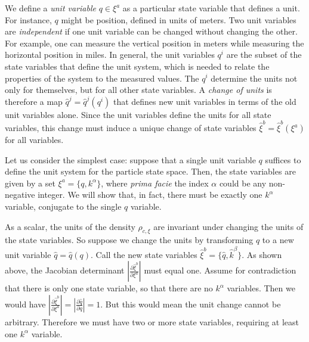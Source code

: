 \documentclass[12pt, english, twoside]{article} %
\begin{document}
We define a \textit{unit variable} $q \in \xi^a$ as a particular state variable that defines a unit. For instance, $q$ might be position, defined in units of meters. Two unit variables are \textit{independent} if one unit variable can be changed without changing the other. For example, one can measure the vertical position in meters while measuring the horizontal position in miles.  In general, the unit variables $q^i$ are the subset of the state variables that define the unit system, which is needed to relate the properties of the system to the measured values. The $q^i$ determine the units not only for themselves, but for all other state variables. A \textit{change of units} is therefore a map $\hat{q}^j = \hat{q}^j(q^i)$ that defines new unit variables in terms of the old unit variables alone. Since the unit variables define the units for all state variables, this change must induce a unique change of state variables $\hat{\xi}^b = \hat{\xi}^b(\xi^a)$ for all variables.

Let us consider the simplest case: suppose that a single unit variable $q $ suffices to define the unit system for the particle state space. Then, the state variables are given by a set $\xi^a = \{ q, k^\alpha \}$, where \textit{prima facie} the index $\alpha$ could be any non-negative integer. We will show that, in fact, there must be exactly one $k^\alpha$ variable, conjugate to the single $q$ variable. 

As a scalar, the units of the density $\rho_{c, \xi}$ are invariant under changing the units of the state variables. So suppose we change the units by transforming $q$ to a new unit variable $\hat{q}=\hat{q}(q)$. Call the new state variables $\hat{\xi}^b = \{ \hat{q}, \hat{k}^\beta\}$. As shown above, the Jacobian determinant $\left|\frac{\partial \hat{\xi}^b}{\partial \xi^a} \right|$ must equal one. Assume for contradiction that there is only one state variable, so that there are no $k^\alpha$ variables. Then we would have $\left|\frac{\partial \hat{\xi}^b}{\partial \xi^a} \right| = \left|\frac{\partial \hat q}{\partial q} \right| = 1$. But this would mean the unit change cannot be arbitrary. Therefore we must have two or more state variables, requiring at least one $k^\alpha$ variable. 
\end{document}
